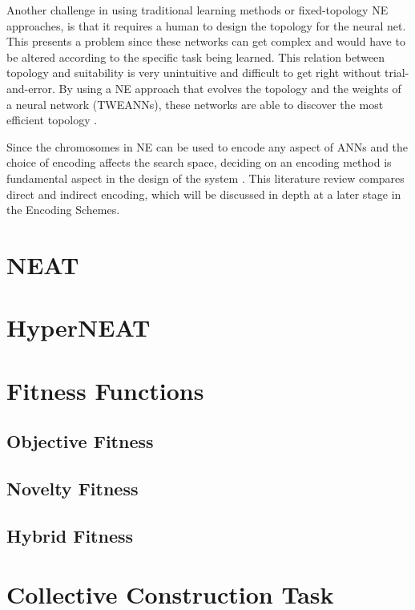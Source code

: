 Another challenge in using traditional learning methods or fixed-topology NE approaches, is that it requires a human to design the topology for the neural net. This presents a problem since these networks can get complex and would have to be altered according to the specific task being learned. This relation between topology and suitability is very unintuitive and difficult to get right without trial-and-error. By using a NE approach that evolves the topology and the weights of a neural network (TWEANNs), these networks are able to discover the most efficient topology \cite{RefWorks:31}.

Since the chromosomes in NE can be used to encode any aspect of ANNs and the choice of encoding affects the search space, deciding on an encoding method is fundamental aspect in the design of the system \cite{RefWorks:31}. This literature review compares direct and indirect encoding, which will be discussed in depth at a later stage in the Encoding Schemes.


\section{NEAT}

\section{HyperNEAT}




\section{Fitness Functions}

\subsection{Objective Fitness}
\subsection{Novelty Fitness}
\subsection{Hybrid Fitness}



\section{Collective Construction Task}

